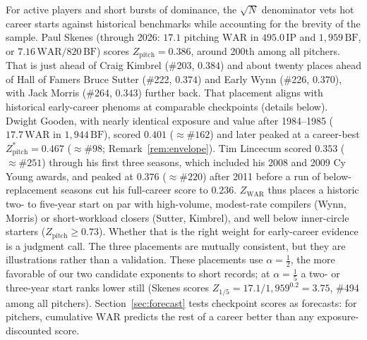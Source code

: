 \documentclass[11pt,letterpaper]{article}
\theoremstyle{plain}
\theoremstyle{definition}
\theoremstyle{remark}
\newcommand{\WAR}{\mathrm{WAR}}
\newcommand{\BF}{\mathrm{BF}}
\newcommand{\IP}{\mathrm{IP}}
\newcommand{\ZWAR}{Z_{\WAR}}
\newcommand{\Zpitch}{Z_{\mathrm{pitch}}}
\begin{document}
For active players and short bursts of dominance, the $\sqrt N$ denominator vets hot career starts against historical benchmarks while accounting for the brevity of the sample. Paul Skenes (through 2026: $17.1$ pitching $\WAR$ in $495.0\,\IP$ and $1{,}959\,\BF$, or $7.16\,\WAR/820\,\BF$) scores $\Zpitch = 0.386$, around 200th among all pitchers. That is just ahead of Craig Kimbrel (\#203, $0.384$) and about twenty places ahead of Hall of Famers Bruce Sutter (\#222, $0.374$) and Early Wynn (\#226, $0.370$), with Jack Morris (\#264, $0.343$) further back. That placement aligns with historical early-career phenoms at comparable checkpoints (details below). Dwight Gooden, with nearly identical exposure and value after 1984--1985 ($17.7\,\WAR$ in $1{,}944\,\BF$), scored $0.401$ ($\approx \#162$) and later peaked at a career-best $\Zpitch^* = 0.467$ ($\approx \#98$; Remark~\ref{rem:envelope}). Tim Lincecum scored $0.353$ ($\approx \#251$) through his first three seasons, which included his 2008 and 2009 Cy Young awards, and peaked at $0.376$ ($\approx \#220$) after 2011 before a run of below-replacement seasons cut his full-career score to $0.236$.
$\ZWAR$ thus places a historic two- to five-year start on par with high-volume, modest-rate compilers (Wynn, Morris) or short-workload closers (Sutter, Kimbrel), and well below inner-circle starters ($\Zpitch \ge 0.73$). Whether that is the right weight for early-career evidence is a judgment call. The three placements are mutually consistent, but they are illustrations rather than a validation. These placements use $\alpha = \tfrac12$, the more favorable of our two candidate exponents to short records; at $\alpha = \tfrac15$ a two- or three-year start ranks lower still (Skenes scores $Z_{1/5} = 17.1/1{,}959^{0.2} = 3.75$, \#494 among all pitchers). Section~\ref{sec:forecast} tests checkpoint scores as forecasts: for pitchers, cumulative $\WAR$ predicts the rest of a career better than any exposure-discounted score.
\end{document}
